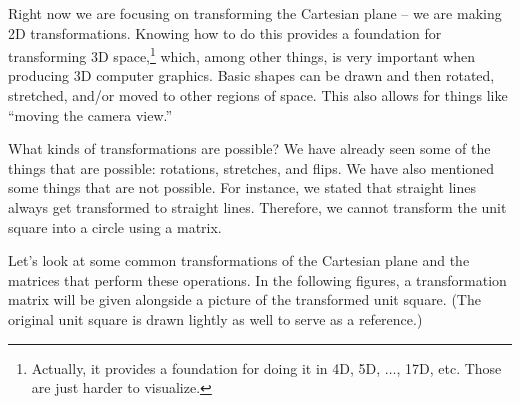 {\enlargethispage{3\baselineskip}
\begin{myfigure}
\begin{center}
\end{center}
\label{fig:transf_2_2}
\end{myfigure}
\baselineskip}

\medskip

Right now we are focusing on transforming the Cartesian plane -- we are making 2D transformations. Knowing how to do this provides a foundation for transforming 3D space,\footnote{Actually, it provides a foundation for doing it in 4D, 5D, $\ldots$, 17D, etc. Those are just harder to visualize.} which, among other things, is very important when producing 3D computer graphics. Basic shapes can be drawn and then rotated, stretched, and/or moved to other regions of space. This also allows for things like ``moving the camera view.'' 

What kinds of transformations are possible? We have already seen some of the things that are possible: rotations, stretches, and flips. We have also mentioned some things that are not possible. For instance, we stated that straight lines always get transformed to straight lines. Therefore, we cannot transform the unit square into a circle using a matrix.

Let's look at some common transformations of the Cartesian plane and the matrices that perform these operations. In the following figures, a transformation matrix will be given alongside a picture of the transformed unit square. (The original unit square is drawn lightly as well to serve as a reference.)\\

